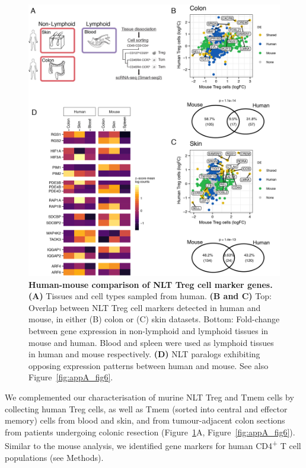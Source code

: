 \begin{figure}[pt] 
\centering    
\includegraphics[width=1.0\textwidth]{Chapter2/Figs/chap2_fig5.png} %
\caption[Human-mouse comparison of NLT Treg cell marker genes.]{\textbf{Human-mouse comparison of NLT Treg cell marker genes.}\newline\textbf{(A)} Tissues and cell types sampled from human. \textbf{(B and C)} Top: Overlap between NLT Treg cell markers detected in human and mouse, in either (B) colon or (C) skin datasets. Bottom: Fold-change between gene expression in non-lymphoid and lymphoid tissues in mouse and human. Blood and spleen were used as lymphoid tissues in human and mouse respectively. \textbf{(D)} NLT paralogs exhibiting opposing expression patterns between human and mouse. See also Figure~\ref{fig:appA_fig6}.}
\label{fig:chap2_fig5}
\end{figure}

We complemented our characterisation of murine NLT Treg and Tmem cells by collecting human Treg cells, as well as Tmem (sorted into central and effector memory) cells from blood and skin, and from tumour-adjacent colon sections from patients undergoing colonic resection (Figure~\ref{fig:chap2_fig5}A, Figure~\ref{fig:appA_fig6}). Similar to the mouse analysis, we identified gene markers for human CD4\textsuperscript{+} T cell populations (see Methods).


